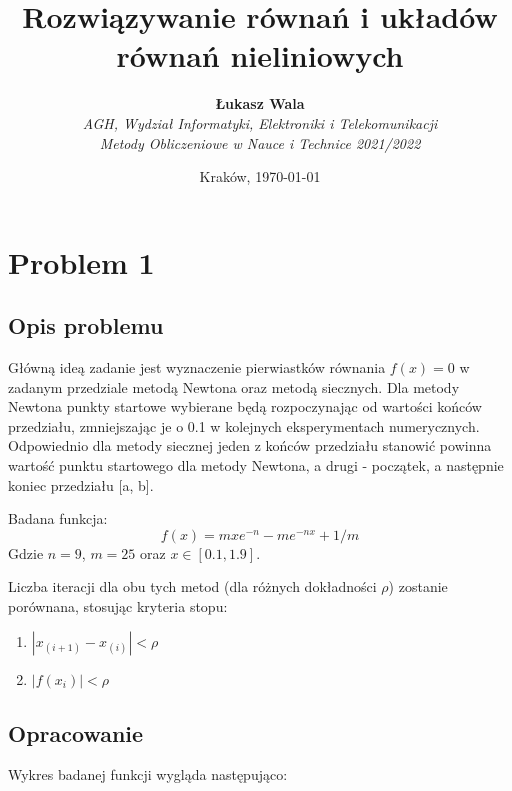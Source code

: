 \documentclass{article}
\title{Rozwiązywanie równań i układów równań nieliniowych}
\author{\textbf{Łukasz Wala}\\
    \textit{AGH, Wydział Informatyki, Elektroniki i Telekomunikacji} \\
    \textit{Metody Obliczeniowe w Nauce i Technice 2021/2022}}
\date{Kraków, \today}
\begin{document}
\maketitle

\section{Problem 1}
\subsection{Opis problemu}
Główną ideą zadanie jest wyznaczenie pierwiastków równania $f(x)=0$ w zadanym przedziale metodą Newtona oraz metodą siecznych.
Dla metody Newtona punkty startowe wybierane będą rozpoczynając od wartości końców przedziału, zmniejszając je o 0.1 w kolejnych eksperymentach numerycznych.
Odpowiednio dla metody siecznej jeden z końców przedziału stanowić powinna wartość punktu startowego dla 
metody Newtona, a drugi - początek, a następnie koniec przedziału [a, b].

Badana funkcja:
\[f(x)=mxe^{-n}-me^{-nx}+1/m\]
Gdzie $n=9$, $m=25$ oraz $x\in [0.1,1.9]$.

Liczba iteracji dla obu tych metod (dla różnych dokładności $\rho$) zostanie porównana, stosując kryteria stopu:
\begin{enumerate}
    \item 
    $\left|x_{(i+1)}-x_{(i)}\right| < \rho$
    \item
    $\left|f(x_i)\right| < \rho$
\end{enumerate}

\subsection{Opracowanie}
Wykres badanej funkcji wygląda następująco:
\end{document}

